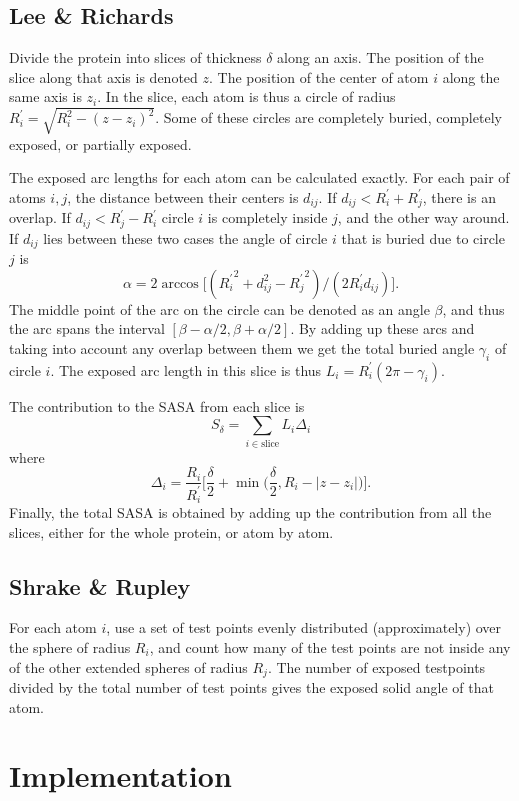 \documentclass[a4paper,11pt]{article}
\begin{document}
\subsection{Lee \& Richards}

Divide the protein into slices of thickness $\delta$ along an
axis. The position of the slice along that axis is denoted $z$. The
position of the center of atom $i$ along the same axis is $z_i$. In
the slice, each atom is thus a circle of radius $R_i^\prime =
\sqrt{R_i^2-(z-z_i)^2}$. Some of these circles are completely buried,
completely exposed, or partially exposed.

The exposed arc lengths for each atom can be calculated exactly. For
each pair of atoms $i,j$, the distance between their centers is
$d_{ij}$. If $d_{ij} < R_i^\prime + R_j^\prime$, there is an
overlap. If $d_{ij} < R_j^\prime - R_i^\prime$ circle $i$ is
completely inside $j$, and the other way around. If $d_{ij}$ lies
between these two cases the angle of circle $i$ that is buried due to
circle $j$ is $$\alpha = 2\arccos \bigl[({R_i^\prime}^2 + d_{ij}^2 -
  {R_{j}^\prime}^2)/(2R_i^\prime d_{ij})\bigr].$$ The middle point of
the arc on the circle can be denoted as an angle $\beta$, and thus the
arc spans the interval $[\beta-\alpha/2,\beta+\alpha/2]$. By adding up
these arcs and taking into account any overlap between them we get
the total buried angle $\gamma_i$ of circle $i$. The exposed arc length in
this slice is thus $L_i = R_i^\prime(2\pi-\gamma_i)$.

The contribution to the SASA from each slice is $$ S_\delta =
\sum_{i \in \text{slice}}L_i\Delta_i $$ where
$$
  \Delta_i = \frac{R_i}{R_i^\prime} \Biggl[\frac{\delta}{2} 
    + \min\Biggl(\frac{\delta}{2},R_i -
    \lvert z - z_i \rvert\Biggr)\Biggr]. 
$$ 
Finally, the total SASA is obtained by adding up the contribution from
all the slices, either for the whole protein, or atom by atom.

\subsection{Shrake \& Rupley}

For each atom $i$, use a set of test points evenly distributed
(approximately) over the sphere of radius $R_i$, and count how many of
the test points are not inside any of the other extended spheres of
radius $R_j$. The number of exposed testpoints divided by the total
number of test points gives the exposed solid angle of that atom.

\section{Implementation}
\end{document}
